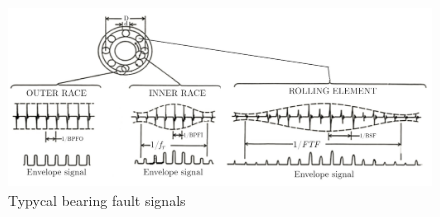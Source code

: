 \begin{figure}
    \centering
    \includegraphics[width=.9\textwidth]{images/StateArt/bearing.jpg}
    \caption{Typycal bearing fault signals \cite{RollingSignature}}
    \label{fig:bearing_faults}
\end{figure}